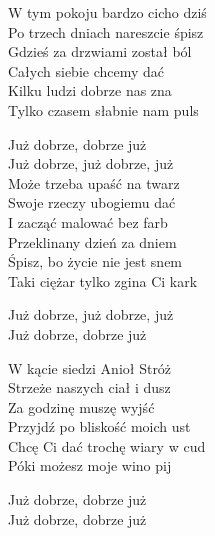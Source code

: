 \begin{text}
    W tym pokoju bardzo cicho dziś\\
    Po trzech dniach nareszcie śpisz\\
    Gdzieś za drzwiami został ból\\
    Całych siebie chcemy dać\\
    Kilku ludzi dobrze nas zna\\
    Tylko czasem słabnie nam puls

    Już dobrze, dobrze już\\
    Już dobrze, już dobrze, już\\

    Może trzeba upaść na twarz\\ 
    Swoje rzeczy ubogiemu dać\\ 
    I zacząć malować bez farb\\ 
    Przeklinany dzień za dniem\\ 
    Śpisz, bo życie nie jest snem\\ 
    Taki ciężar tylko zgina Ci kark

    Już dobrze, już dobrze, już\\ 
    Już dobrze, dobrze już

    W kącie siedzi Anioł Stróż\\ 
    Strzeże naszych ciał i dusz\\ 
    Za godzinę muszę wyjść\\ 
    Przyjdź po bliskość moich ust\\ 
    Chcę Ci dać trochę wiary w cud\\ 
    Póki możesz moje wino pij

    Już dobrze, dobrze już\\ 
    Już dobrze, dobrze już
\end{text}
\begin{chord}

\end{chord}